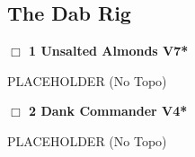 \begin{multicols}{2}
\needspace{3em}
\subsection*{The Dab Rig}\label{bf:The Dab Rig}



\needspace{2em}
\label{rt:Unsalted Almonds}
\colorbox{Goldenrod!20}{
\parbox{0.95\linewidth}{
\hspace{-1ex}\textbf{$\Box$
1 Unsalted Almonds V7*  
}}}
\begin{adjustwidth}{1.3em}{}			
PLACEHOLDER
  (No Topo)
\end{adjustwidth}




\needspace{2em}
\label{rt:Dank Commander}
\colorbox{RoyalBlue!20}{
\parbox{0.95\linewidth}{
\hspace{-1ex}\textbf{$\Box$
2 Dank Commander V4*  
}}}
\begin{adjustwidth}{1.3em}{}			
PLACEHOLDER
  (No Topo)
\end{adjustwidth}






\end{multicols}
\clearpage